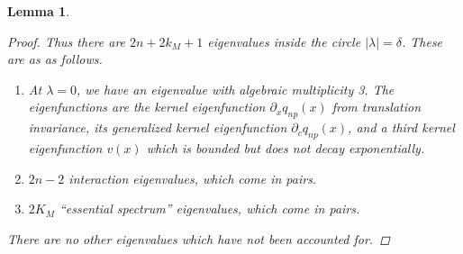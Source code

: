 \documentclass[12pt]{article}
\newtheorem{lemma}{Lemma}
\begin{document}
\begin{lemma}
\begin{proof}
Thus there are $2n + 2 k_M + 1$ eigenvalues inside the circle $|\lambda| = \delta$. These are as as follows.
\begin{enumerate}
	\item At $\lambda = 0$, we have an eigenvalue with algebraic multiplicity 3. The eigenfunctions are the kernel eigenfunction $\partial_x q_{np}(x)$ from translation invariance, its generalized kernel eigenfunction $\partial_c q_{np}(x)$, and a third kernel eigenfunction $v(x)$ which is bounded but does not decay exponentially.
	\item $2n - 2$ interaction eigenvalues, which come in pairs.
	\item $2 K_M$ ``essential spectrum'' eigenvalues, which come in pairs.
\end{enumerate}

There are no other eigenvalues which have not been accounted for.
\end{proof}
\end{lemma}
\end{document}
